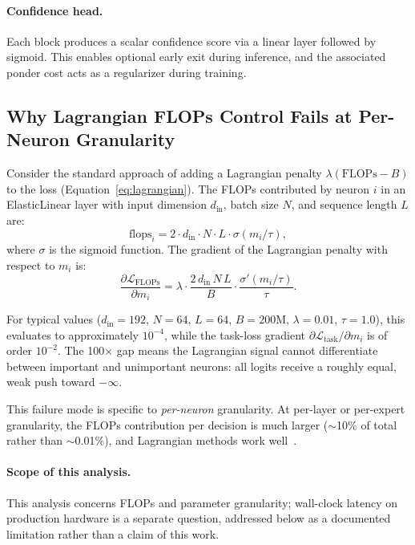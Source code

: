 \paragraph{Confidence head.} Each block produces a scalar confidence score via a linear layer followed by sigmoid. This enables optional early exit during inference, and the associated ponder cost acts as a regularizer during training.

\subsection{Why Lagrangian FLOPs Control Fails at Per-Neuron Granularity}
\label{sec:gradient_analysis}

Consider the standard approach of adding a Lagrangian penalty $\lambda(\text{FLOPs} - B)$ to the loss (Equation~\ref{eq:lagrangian}). The FLOPs contributed by neuron $i$ in an ElasticLinear layer with input dimension $d_{\text{in}}$, batch size $N$, and sequence length $L$ are:
\begin{equation}
\text{flops}_i = 2 \cdot d_{\text{in}} \cdot N \cdot L \cdot \sigma(m_i / \tau),
\end{equation}
where $\sigma$ is the sigmoid function. The gradient of the Lagrangian penalty with respect to $m_i$ is:
\begin{equation}
\frac{\partial \mathcal{L}_{\text{FLOPs}}}{\partial m_i} = \lambda \cdot \frac{2 \, d_{\text{in}} \, N \, L}{B} \cdot \frac{\sigma'(m_i / \tau)}{\tau}.
\end{equation}

For typical values ($d_{\text{in}} {=} 192$, $N {=} 64$, $L {=} 64$, $B {=} 200\text{M}$, $\lambda {=} 0.01$, $\tau {=} 1.0$), this evaluates to approximately $10^{-4}$, while the task-loss gradient $\partial \mathcal{L}_{\text{task}} / \partial m_i$ is of order $10^{-2}$. The 100$\times$ gap means the Lagrangian signal cannot differentiate between important and unimportant neurons: all logits receive a roughly equal, weak push toward $-\infty$.

\begin{remark}
This failure mode is specific to \emph{per-neuron} granularity. At per-layer or per-expert granularity, the FLOPs contribution per decision is much larger ($\sim$10\% of total rather than $\sim$0.01\%), and Lagrangian methods work well~\citep{gordon2018morphnet}.
\end{remark}

\paragraph{Scope of this analysis.} This analysis concerns FLOPs and parameter granularity; wall-clock latency on production hardware is a separate question, addressed below as a documented limitation rather than a claim of this work.

